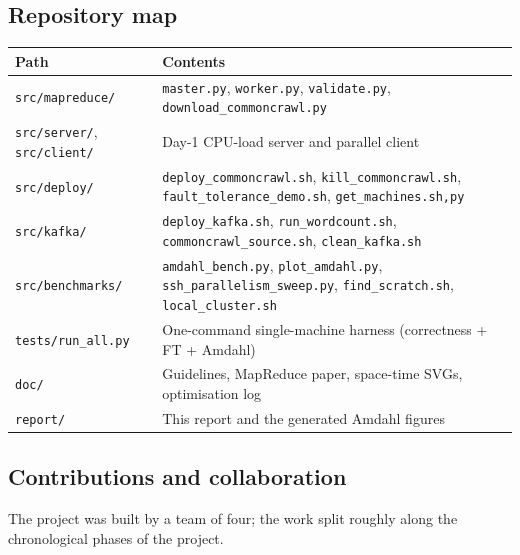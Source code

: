 \documentclass[11pt,a4paper]{article}
\newcommand{\code}[1]{\texttt{\small #1}}
\begin{document}
\subsection{Repository map}

\begin{table}[H]
\centering
\small
\renewcommand{\arraystretch}{1.15}
\begin{tabularx}{\textwidth}{@{}lX@{}}
\toprule
\textbf{Path} & \textbf{Contents}\\
\midrule
\code{src/mapreduce/} & \code{master.py}, \code{worker.py}, \code{validate.py}, \code{download\_commoncrawl.py}\\
\code{src/server/}, \code{src/client/} & Day-1 CPU-load server and parallel client\\
\code{src/deploy/} & \code{deploy\_commoncrawl.sh}, \code{kill\_commoncrawl.sh}, \code{fault\_tolerance\_demo.sh}, \code{get\_machines.{sh,py}}\\
\code{src/kafka/} & \code{deploy\_kafka.sh}, \code{run\_wordcount.sh}, \code{commoncrawl\_source.sh}, \code{clean\_kafka.sh}\\
\code{src/benchmarks/} & \code{amdahl\_bench.py}, \code{plot\_amdahl.py}, \code{ssh\_parallelism\_sweep.py}, \code{find\_scratch.sh}, \code{local\_cluster.sh}\\
\code{tests/run\_all.py} & One-command single-machine harness (correctness + FT + Amdahl)\\
\code{doc/} & Guidelines, MapReduce paper, space-time SVGs, optimisation log\\
\code{report/} & This report and the generated Amdahl figures\\
\bottomrule
\end{tabularx}
\end{table}

\subsection{Contributions and collaboration}\label{sec:contrib}

The project was built by a team of four; the work split roughly along the
chronological phases of the project.
\end{document}
